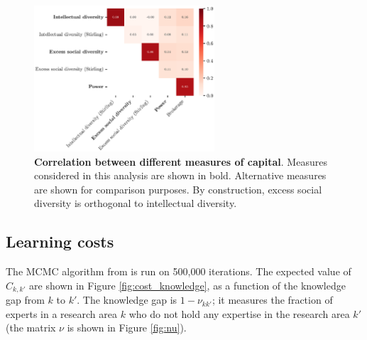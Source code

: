\documentclass{article}
\begin{document}
\begin{figure}[h]
    \centering
    \includegraphics[width=0.6\textwidth]{plots/capital_measures.eps}
    \caption{\textbf{Correlation between different measures of capital}. Measures considered in this analysis are shown in bold. Alternative measures are shown for comparison purposes. By construction, excess social diversity is orthogonal to intellectual diversity. }
    \label{fig:capital_measures}
\end{figure}


\subsection{Learning costs}

The MCMC algorithm from \citet{Chu2021} is run on 500,000 iterations. The expected value of $C_{k,k'}$ are shown in Figure \ref{fig:cost_knowledge}, as a function of the knowledge gap from $k$ to $k'$. The knowledge gap is $1-\nu_{kk'}$; it measures the fraction of experts in a research area $k$ who do not hold any expertise in the research area $k'$ (the matrix $\nu$ is shown in Figure \ref{fig:nu}).
\end{document}
